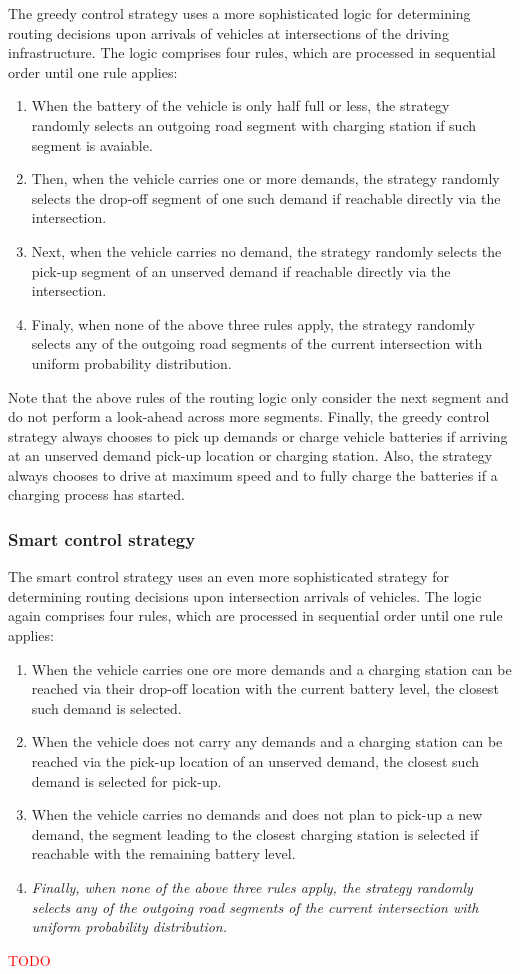 \documentclass[10pt,twocolumn]{article}
\begin{document}
The greedy control strategy uses a more sophisticated logic for determining routing decisions upon arrivals of vehicles at intersections of the driving infrastructure.
The logic comprises four rules, which are processed in sequential order until one rule applies:
\begin{enumerate}
    \item When the battery of the vehicle is only half full or less, the strategy randomly selects an outgoing road segment with charging station if such segment is avaiable.
    \item Then, when the vehicle carries one or more demands, the strategy randomly selects the drop-off segment of one such demand if reachable directly via the intersection.
    \item Next, when the vehicle carries no demand, the strategy randomly selects the pick-up segment of an unserved demand if reachable directly via the intersection.
    \item Finaly, when none of the above three rules apply, the strategy randomly selects any of the outgoing road segments of the current intersection with uniform probability distribution.
\end{enumerate}
Note that the above rules of the routing logic only consider the next segment and do not perform a look-ahead across more segments.
Finally, the greedy control strategy always chooses to pick up demands or charge vehicle batteries if arriving at an unserved demand pick-up location or charging station.
Also, the strategy always chooses to drive at maximum speed and to fully charge the batteries if a charging process has started.

\subsubsection*{Smart control strategy}
\label{sec:controller-smart}

The smart control strategy uses an even more sophisticated strategy for determining routing decisions upon intersection arrivals of vehicles.
The logic again comprises four rules, which are processed in sequential order until one rule applies:
\begin{enumerate}
    \item When the vehicle carries one ore more demands and a charging station can be reached via their drop-off location with the current battery level, the closest such demand is selected.
    \item When the vehicle does not carry any demands and a charging station can be reached via the pick-up location of an unserved demand, the closest such demand is selected for pick-up.
    \item When the vehicle carries no demands and does not plan to pick-up a new demand, the segment leading to the closest charging station is selected if reachable with the remaining battery level.
    \item \textit{Finally, when none of the above three rules apply, the strategy randomly selects any of the outgoing road segments of the current intersection with uniform probability distribution.}
\end{enumerate}
\textcolor{red}{TODO}
\end{document}
